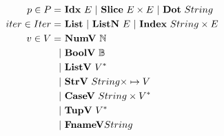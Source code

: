 \begin{align*}
  p \in P =& ~ \idxp ~ E ~ | ~ \slicep ~ E \times E ~ | ~ \dotp ~ String \\
%
  iter \in Iter =& ~ \listiter ~ | ~ \listniter ~ E ~|~ \listidxiter ~ String \times E \\
%
  v \in V =& ~ \numv ~ \mathbb N \\
    | & ~ \boolv ~ \mathbb B \\
    | & ~ \listv ~ \seq V \\
    | & ~ \strv ~ String \times \mapsto V \\
    | & ~ \casev ~ String \times \seq V \\
    | & ~ \tupv ~ \seq V \\
    | & ~ \fnamev String \\
\end{align*}





\newpage

